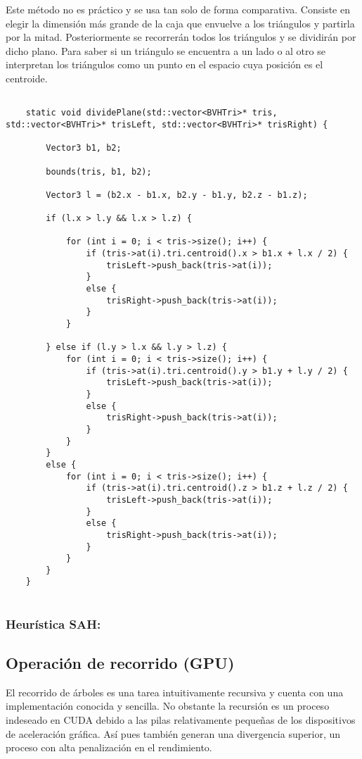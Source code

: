 Este método no es práctico y se usa tan solo de forma comparativa. Consiste en elegir la dimensión más grande de la caja que envuelve a los triángulos y partirla por la mitad. Posteriormente se recorrerán todos los triángulos y se dividirán por dicho plano. Para saber si un triángulo se encuentra a un lado o al otro se interpretan los triángulos como un punto en el espacio cuya posición es el centroide.

\begin{lstlisting}
	
	static void dividePlane(std::vector<BVHTri>* tris, std::vector<BVHTri>* trisLeft, std::vector<BVHTri>* trisRight) {

		Vector3 b1, b2;

		bounds(tris, b1, b2);

		Vector3 l = (b2.x - b1.x, b2.y - b1.y, b2.z - b1.z);

		if (l.x > l.y && l.x > l.z) {

			for (int i = 0; i < tris->size(); i++) {
				if (tris->at(i).tri.centroid().x > b1.x + l.x / 2) {
					trisLeft->push_back(tris->at(i));
				}
				else {
					trisRight->push_back(tris->at(i));
				}
			}

		} else if (l.y > l.x && l.y > l.z) {
			for (int i = 0; i < tris->size(); i++) {
				if (tris->at(i).tri.centroid().y > b1.y + l.y / 2) {
					trisLeft->push_back(tris->at(i));
				}
				else {
					trisRight->push_back(tris->at(i));
				}
			}
		}
		else {
			for (int i = 0; i < tris->size(); i++) {
				if (tris->at(i).tri.centroid().z > b1.z + l.z / 2) {
					trisLeft->push_back(tris->at(i));
				}
				else {
					trisRight->push_back(tris->at(i));
				}
			}
		}
	}
	
\end{lstlisting}

\subsubsection{Heurística SAH:}
	

\subsection{Operación de recorrido (GPU)}
	
El recorrido de árboles es una tarea intuitivamente recursiva y cuenta con una implementación conocida y sencilla. No obstante la recursión es un proceso indeseado en CUDA debido a las pilas relativamente pequeñas de los dispositivos de aceleración gráfica. Así pues también generan una divergencia superior, un proceso con alta penalización en el rendimiento.

